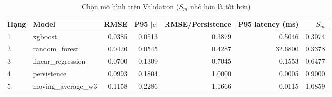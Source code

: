 \begin{table}[H]\centering\small
\caption{Chọn mô hình trên Validation ($S_m$ nhỏ hơn là tốt hơn)}\label{tab:w10-selection}
\begin{tabular}{llrrrrr}\toprule
Hạng & Model & RMSE & P95 $|e|$ & RMSE/Persistence & P95 latency (ms) & $S_m$ \\\midrule
1 & xgboost & 0.0385 & 0.0513 & 0.3879 & 0.5046 & 0.3074 \\
2 & random\_forest & 0.0426 & 0.0545 & 0.4287 & 32.6800 & 0.3378 \\
3 & linear\_regression & 0.0700 & 0.1309 & 0.7045 & 0.1553 & 0.6477 \\
4 & persistence & 0.0993 & 0.1804 & 1.0000 & 0.0005 & 0.9000 \\
5 & moving\_average\_w3 & 0.1158 & 0.2286 & 1.1666 & 0.0115 & 1.0859 \\
\bottomrule\end{tabular}
\end{table}
